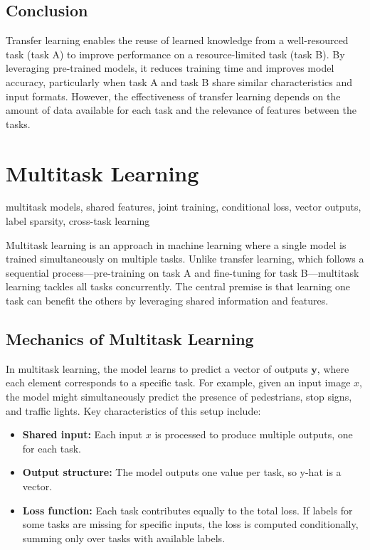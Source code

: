 \documentclass[12pt,openany, draft]{book}
\begin{document}
\subsection{Conclusion}

Transfer learning enables the reuse of learned knowledge from a well-resourced task (task A) to improve performance on a resource-limited task (task B). By leveraging pre-trained models, it reduces training time and improves model accuracy, particularly when task A and task B share similar characteristics and input formats. However, the effectiveness of transfer learning depends on the amount of data available for each task and the relevance of features between the tasks. 



\section{Multitask Learning}

\begin{keywordsbox}
multitask models, shared features, joint training, conditional loss, vector outputs, label sparsity, cross-task learning
\end{keywordsbox}

Multitask learning is an approach in machine learning where a single model is trained simultaneously on multiple tasks. Unlike transfer learning, which follows a sequential process—pre-training on task A and fine-tuning for task B—multitask learning tackles all tasks concurrently. The central premise is that learning one task can benefit the others by leveraging shared information and features.


\subsection{Mechanics of Multitask Learning}

In multitask learning, the model learns to predict a vector of outputs \( \mathbf{y} \), where each element corresponds to a specific task. For example, given an input image \( x \), the model might simultaneously predict the presence of pedestrians, stop signs, and traffic lights. Key characteristics of this setup include:
\begin{itemize}
    \item \textbf{Shared input:} Each input \( x \) is processed to produce multiple outputs, one for each task.
    \item \textbf{Output structure:} The model outputs one value per task, so y-hat is a vector.
    \item \textbf{Loss function:} Each task contributes equally to the total loss. If labels for some tasks are missing for specific inputs, the loss is computed conditionally, summing only over tasks with available labels.
\end{itemize}
\end{document}
